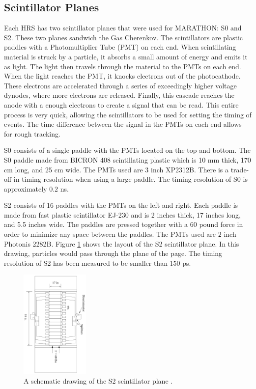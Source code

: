 \subsection{Scintillator Planes}

Each HRS has two scintillator planes that were used for MARATHON: S0 and S2. These two planes sandwich the Gas Cherenkov. The scintillators are plastic paddles with a Photomultiplier Tube (PMT) on each end. When scintillating material is struck by a particle, it absorbs a small amount of energy and emits it as light. The light then travels through the material to the PMTs on each end. When the light reaches the PMT, it knocks electrons out of the photocathode. These electrons are accelerated through a series of exceedingly higher voltage dynodes, where more electrons are released. Finally, this cascade reaches the anode with a enough electrons to create a signal that can be read. This entire process is very quick, allowing the scintillators to be used for setting the timing of events. The time difference between the signal in the PMTs on each end allows for rough tracking.

S0 consists of a single paddle with the PMTs located on the top and bottom. The S0 paddle made from BICRON 408 scintillating plastic which is 10 mm thick, 170 cm long, and 25 cm wide. The PMTs used are $3$ inch XP2312B. There is a trade-off in timing resolution when using a large paddle. The timing resolution of S0 is approximately $0.2$ ns.

S2 consists of 16 paddles with the PMTs on the left and right. Each paddle is made from fast plastic scintillator EJ-230 and is 2 inches thick, 17 inches long, and 5.5 inches wide. The paddles are pressed together with a 60 pound force in order to minimize any space between the paddles. The PMTs used are $2$ inch Photonis 2282B. Figure \ref{fig:s2} shows the layout of the S2 scintillator plane. In this drawing, particles would pass through the plane of the page. The timing resolution of S2 has been measured to be smaller than $150$ ps.

\begin{figure}
\begin{center}
	\includegraphics[width=0.3\textwidth]{./setup/fig/s2.png}
	\caption{A schematic drawing of the S2 scintillator plane \cite{HASEM}.}
	\label{fig:s2}
\end{center}
\end{figure}

